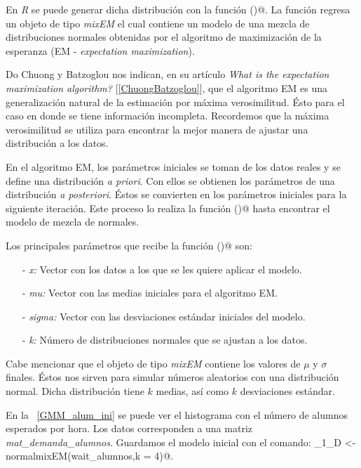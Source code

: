 En \textit{R} se puede generar dicha distribución con la función \verb@normalmixEM()@. La función regresa un objeto de tipo \textit{mixEM} el cual contiene un modelo de una mezcla de distribuciones normales obtenidas por el algoritmo de maximización de la esperanza (EM - \textit{expectation maximization}).

Do Chuong y Batzoglou nos indican, en su artículo \textit{What is the expectation maximization algorithm?} [\ref{ChuongBatzoglou}], que el algoritmo EM es una generalización natural de la estimación por máxima verosimilitud. Ésto para el caso en donde se tiene información incompleta. Recordemos que la máxima verosimilitud se utiliza para encontrar la mejor manera de ajustar una distribución a los datos.

En el algoritmo EM, los parámetros iniciales se toman de los datos reales y se define una distribución \textit{a priori}. Con ellos se obtienen los parámetros de una distribución \textit{a posteriori}. Éstos se convierten en los parámetros iniciales para la siguiente iteración. Este proceso lo realiza la función \verb@normalmixEM()@ hasta encontrar el modelo de mezcla de normales.

Los principales parámetros que recibe la función \verb@normalmixEM()@ son: 
  
  \begin{itemize}
\item[-] \textit{x: } Vector con los datos a los que se les quiere aplicar el modelo.

\item[-] \textit{mu: } Vector con las medias iniciales para el algoritmo EM.

\item[-] \textit{sigma: } Vector con las desviaciones estándar iniciales del modelo.

\item[-] \textit{k: } Número de distribuciones normales que se ajustan a los datos.
\end{itemize}

Cabe mencionar que el objeto de tipo \textit{mixEM} contiene los valores de $\mu$ y $\sigma$ finales. Éstos nos sirven para simular números aleatorios con una distribución normal. Dicha distribución tiene $k$ medias, así como $k$ desviaciones estándar.

En la \figurename{~\ref{GMM_alum_ini}} se puede ver el histograma con el número de alumnos esperados por hora. Los datos corresponden a una matriz \textit{mat\_demanda\_alumnos}. Guardamos el modelo inicial con el comando: \verb@mixmdl_1_D <- normalmixEM(wait_alumnos,k = 4)@.

